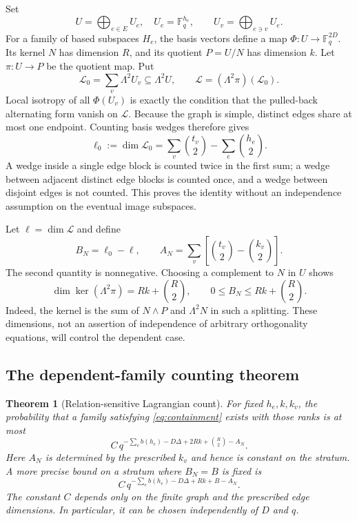 \documentclass[11pt]{article}
\newtheorem{theorem}{Theorem}[section]
\theoremstyle{definition}
\theoremstyle{remark}
\newcommand{\Fq}{\mathbb F_q}
\newcommand{\1}{\mathbf 1}
\begin{document}
Set
\[
 U=\bigoplus_{e\in E}U_e,\quad U_e=\Fq^{h_e},\qquad
 U_v=\bigoplus_{e\ni v}U_e.
\]
For a family of based subspaces $H_e$, the basis vectors define a map
$\Phi:U\to\Fq^{2D}$. Its kernel $N$ has dimension $R$, and its quotient
$P=U/N$ has dimension $k$. Let $\pi:U\to P$ be the quotient map. Put
\begin{equation}
 \mathcal L_0=\sum_v\Lambda^2U_v\subseteq\Lambda^2U,
 \qquad
 \mathcal L=(\Lambda^2\pi)(\mathcal L_0).
 \label{eq:exteriorconstraints}
\end{equation}
Local isotropy of all $\Phi(U_v)$ is exactly the condition that the pulled-back
alternating form vanish on $\mathcal L$.
Because the graph is simple, distinct edges share at most one endpoint.
Counting basis wedges therefore gives
\begin{equation}
 \ell_0:=\dim\mathcal L_0
 =\sum_v\binom{t_v}{2}-\sum_e\binom{h_e}{2}.
 \label{eq:ellzero}
\end{equation}
A wedge inside a single edge block is counted twice in the first sum; a wedge
between adjacent distinct edge blocks is counted once, and a wedge between
disjoint edges is not counted. This proves the identity without an independence
assumption on the eventual image subspaces.

Let $\ell=\dim\mathcal L$ and define
\begin{equation}
 B_N=\ell_0-\ell,\qquad
 A_N=\sum_v\left[\binom{t_v}{2}-\binom{k_v}{2}\right].
 \label{eq:AB}
\end{equation}
The second quantity is nonnegative. Choosing a complement to $N$ in $U$ shows
\begin{equation}
 \dim\ker(\Lambda^2\pi)=Rk+\binom R2,
 \qquad 0\le B_N\le Rk+\binom R2.
 \label{eq:exteriorkernel}
\end{equation}
Indeed, the kernel is the sum of $N\wedge P$ and $\Lambda^2N$ in such a
splitting. These dimensions, not an assertion of independence of arbitrary
orthogonality equations, will control the dependent case.

\subsection{The dependent-family counting theorem}

\begin{theorem}[Relation-sensitive Lagrangian count]
\label{thm:count}
For fixed $h_e,k,k_v$, the probability that a family satisfying
\eqref{eq:containment} exists with those ranks is at most
\begin{equation}
 C\,q^{-\sum_e b(h_e)-D\Delta+2Rk+\binom R2-A_N}.
 \label{eq:maincount}
\end{equation}
Here $A_N$ is determined by the prescribed $k_v$ and hence is constant on the
stratum. A more precise bound on a stratum where $B_N=B$ is fixed is
\begin{equation}
 C\,q^{-\sum_e b(h_e)-D\Delta+Rk+B-A_N}.
 \label{eq:finecount}
\end{equation}
The constant $C$ depends only on the finite graph and the prescribed edge
dimensions. In particular, it can be chosen independently of $D$ and $q$.
\end{theorem}
\end{document}
